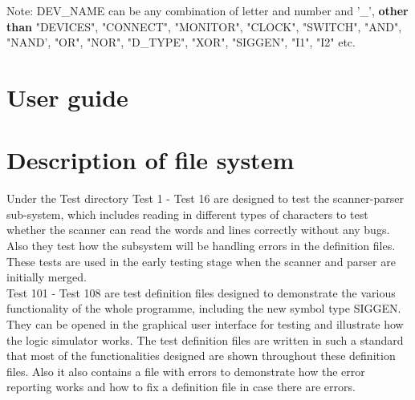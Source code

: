 \documentclass[12pt]{article}
\begin{document}
\vspace{20mm}
Note: DEV\_NAME can be any combination of letter and number and '\_', \textbf{other than} "DEVICES", "CONNECT", "MONITOR", "CLOCK", "SWITCH", "AND", "NAND', "OR", "NOR", "D\_TYPE", "XOR", "SIGGEN", "I1", "I2" etc.
\newpage
\section{User guide}

\newpage
\section{Description of file system}
Under the Test directory
Test 1 - Test 16 are designed to test the scanner-parser sub-system, which includes reading in different types of characters 
to test whether the scanner can read the words and lines correctly without any bugs. Also they test how the subsystem will be 
handling errors in the definition files. These tests are used in the early testing stage when the scanner and parser are 
initially merged.\\

Test 101 - Test 108 are test definition files designed to demonstrate the various functionality of the whole programme, including the new symbol type SIGGEN. They can be opened in the graphical user interface for testing and illustrate how the logic simulator works. The test definition files are written in such a standard that most of the functionalities designed are shown throughout these definition files. Also it also contains a file with errors to demonstrate how the error reporting works and how to fix a definition file in case there are errors.\\
 
\end{document}
